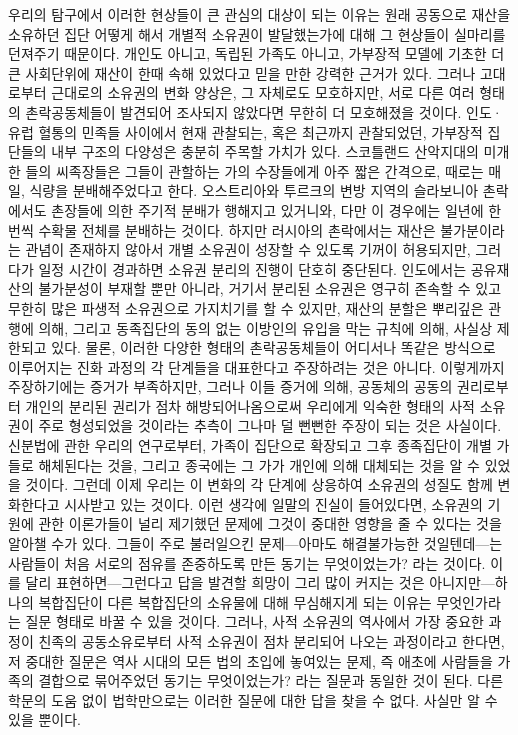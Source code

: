 우리의 탐구에서 이러한 현상들이 큰 관심의 대상이 되는 이유는
원래 공동으로 재산을 소유하던 집단 
어떻게 해서 개별적 소유권이 발달했는가에 대해
그 현상들이 실마리를 던져주기 때문이다.
개인도 아니고,
독립된 가족도 아니고,
가부장적 모델에 기초한 더 큰 사회단위에
재산이 한때 속해 있었다고 믿을 만한 강력한 근거가 있다.
그러나
고대로부터 근대로의 소유권의 변화 양상은,
그 자체로도 모호하지만,
서로 다른 여러 형태의 촌락공동체들이 발견되어 조사되지 않았다면
무한히 더 모호해졌을 것이다.
인도^^b7유럽 혈통의 민족들 사이에서
현재 관찰되는, 혹은 최근까지 관찰되었던,
가부장적 집단들의 내부 구조의 다양성은 충분히 주목할 가치가 있다.
스코틀랜드 산악지대의 미개한 들의 씨족장들은
그들이 관할하는 가의 수장들에게
아주 짧은 간격으로, 때로는 매일,
식량을 분배해주었다고 한다.
오스트리아와 투르크의 변방 지역의 슬라보니아 촌락에서도
촌장들에 의한 주기적 분배가 행해지고 있거니와, 다만
이 경우에는 일년에 한번씩 수확물 전체를 분배하는 것이다.
하지만 러시아의 촌락에서는
재산은 불가분이라는 관념이 존재하지 않아서
개별 소유권이 성장할 수 있도록 기꺼이 허용되지만,
그러다가 일정 시간이 경과하면 소유권 분리의 진행이 단호히 중단된다.
인도에서는 공유재산의 불가분성이 부재할 뿐만 아니라,
거기서 분리된 소유권은 영구히 존속할 수 있고
무한히 많은 파생적 소유권으로 가지치기를 할 수 있지만,
재산의 분할은
뿌리깊은 관행에 의해,
그리고 동족집단의 동의 없는 이방인의 유입을 막는 규칙에 의해,
사실상
제한되고 있다.
물론,
이러한 다양한 형태의 촌락공동체들이
어디서나 똑같은 방식으로 이루어지는 진화 과정의
각 단계들을 대표한다고 주장하려는 것은 아니다.
이렇게까지 주장하기에는 증거가 부족하지만,
그러나
이들 증거에 의해,
공동체의 공동의 권리로부터
개인의 분리된 권리가 점차 해방되어나옴으로써
우리에게 익숙한 형태의 사적 소유권이
주로 형성되었을 것이라는 추측이
그나마 덜 뻔뻔한 주장이 되는 것은 사실이다.
신분법에 관한 우리의 연구로부터,
가족이 집단으로 확장되고
그후 종족집단이 개별 가들로 해체된다는 것을,
그리고 종국에는
그 가가 개인에 의해 대체되는 것을
알 수 있었을 것이다.
그런데
이제 우리는 이 변화의 각 단계에 상응하여
소유권의 성질도 함께 변화한다고 시사받고 있는 것이다.
이런 생각에 일말의 진실이 들어있다면,
소유권의 기원에 관한 이론가들이 널리 제기했던 문제에
그것이
중대한 영향을 줄 수 있다는 것을 알아챌 수가 있다.
그들이 주로 불러일으킨 문제---아마도 해결불가능한 것일텐데---는
사람들이 처음 서로의 점유를 존중하도록 만든 동기는 무엇이었는가? 라는 것이다.
이를 달리 표현하면---그런다고 답을 발견할 희망이 그리 많이 커지는 것은
아니지만---하나의 복합집단이 다른 복합집단의 소유물에 대해
무심해지게 되는 이유는 무엇인가라는 질문 형태로 바꿀 수 있을 것이다.
그러나,
사적 소유권의 역사에서 가장 중요한 과정이
친족의 공동소유로부터 사적 소유권이 점차 분리되어 나오는 과정이라고 한다면,
저 중대한 질문은 역사 시대의 모든 법의 초입에 놓여있는 문제, 즉
애초에 사람들을 가족의 결합으로 묶어주었던 동기는 무엇이었는가? 라는 질문과
동일한 것이 된다.
다른 학문의 도움 없이 법학만으로는 이러한 질문에 대한 답을 찾을 수 없다.
사실만 알 수 있을 뿐이다.

